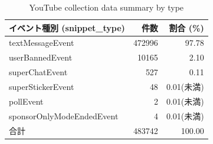 \begin{table}[h]
    \centering
    \caption{YouTube collection data summary by type}
    \label{tab:data_collection_results}
    \begin{tabular}{lrr}
        \hline
        イベント種別 (snippet\_type) & 件数     & 割合 (\%)  \\
        \hline
        \hline
        textMessageEvent       & 472996  & 97.78    \\
        userBannedEvent        & 10165   & 2.10     \\
        superChatEvent         & 527    & 0.11     \\
        superStickerEvent      & 48     & 0.01(未満) \\
        pollEvent              & 2      & 0.01(未満) \\
        sponsorOnlyModeEndedEvent & 4   & 0.01(未満) \\
        \hline
        合計                     & 483742 & 100.00   \\
        \hline
    \end{tabular}
\end{table}